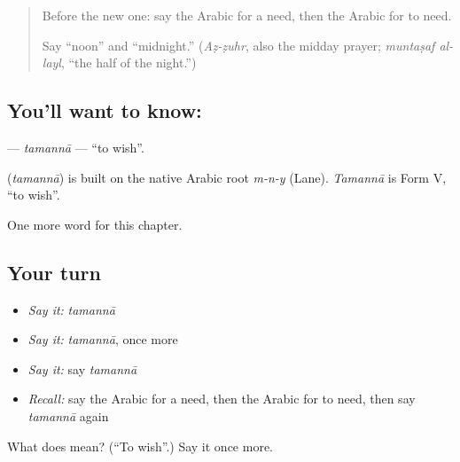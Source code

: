 \begin{quote}
Before the new one: say the Arabic for a need, then the Arabic for to need.

Say \textquotedblleft{}noon\textquotedblright{} and \textquotedblleft{}midnight.\textquotedblright{} (\emph{Aẓ-ẓuhr}, also the midday prayer; \emph{muntaṣaf al-layl}, \textquotedblleft{}the half of the night.\textquotedblright{})
\end{quote}

\subsection*{You'll want to know: }
\textbf{} — \emph{tamannā} — \textquotedblleft{}to wish\textquotedblright{}.

\begin{cousinweb}
\textbf{} (\emph{tamannā}) is built on the native Arabic root \emph{m-n-y} (Lane). \emph{Tamannā} is Form V, \textquotedblleft{}to wish\textquotedblright{}.
\end{cousinweb}

\begin{grammarlens}[title={What you've built}]
One more word for this chapter.
\end{grammarlens}

\subsection*{Your turn}
\begin{itemize}
\raggedright
  \item \emph{Say it:} \emph{tamannā}
  \item \emph{Say it:} \emph{tamannā}, once more
  \item \emph{Say it:} say \emph{tamannā}
  \item \emph{Recall:} say the Arabic for a need, then the Arabic for to need, then say \emph{tamannā} again
\end{itemize}

\begin{tcolorbox}[breakable,colback=teal!4,colframe=teal!35!black,title={Before you move on}]
What does  mean? (\textquotedblleft{}To wish\textquotedblright{}.) Say it once more.
\end{tcolorbox}
